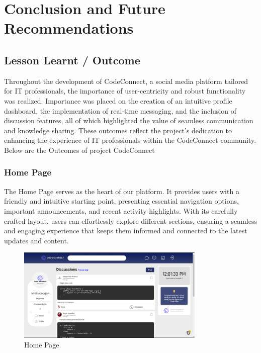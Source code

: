 \chapter{Conclusion and Future Recommendations}

\section{Lesson Learnt / Outcome}
Throughout the development of CodeConnect, a social media platform tailored for IT professionals, the importance of user-centricity and robust functionality was realized. Importance was placed on the creation of an intuitive profile dashboard, the implementation of real-time messaging, and the inclusion of discussion features, all of which highlighted the value of seamless communication and knowledge sharing. These outcomes reflect the project's dedication to enhancing the experience of IT professionals within the CodeConnect community. Below are the Outcomes of project CodeConnect

\subsection{Home Page}
The Home Page serves as the heart of our platform. It provides users with a friendly and intuitive starting point, presenting essential navigation options, important announcements, and recent activity highlights. With its carefully crafted layout, users can effortlessly explore different sections, ensuring a seamless and engaging experience that keeps them informed and connected to the latest updates and content.
\begin{figure}[H]
    \centering
    \includegraphics[width=0.8\textwidth]{Outcome-ss/homepage.png}
    \caption{Home Page.}
    \label{fig:Home Page}
\end{figure}
\newpage
